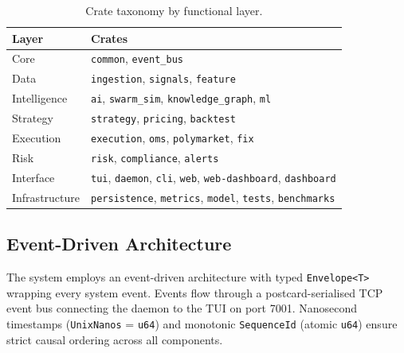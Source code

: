 \documentclass[11pt]{article}
\theoremstyle{definition}
\begin{document}
\begin{table}[H]
\centering
\caption{Crate taxonomy by functional layer.}
\label{tab:crates}
\small
\begin{tabular}{@{}lp{10cm}@{}}
\toprule
\textbf{Layer} & \textbf{Crates} \\
\midrule
Core & \texttt{common}, \texttt{event\_bus} \\
Data & \texttt{ingestion}, \texttt{signals}, \texttt{feature} \\
Intelligence & \texttt{ai}, \texttt{swarm\_sim}, \texttt{knowledge\_graph}, \texttt{ml} \\
Strategy & \texttt{strategy}, \texttt{pricing}, \texttt{backtest} \\
Execution & \texttt{execution}, \texttt{oms}, \texttt{polymarket}, \texttt{fix} \\
Risk & \texttt{risk}, \texttt{compliance}, \texttt{alerts} \\
Interface & \texttt{tui}, \texttt{daemon}, \texttt{cli}, \texttt{web}, \texttt{web-dashboard}, \texttt{dashboard} \\
Infrastructure & \texttt{persistence}, \texttt{metrics}, \texttt{model}, \texttt{tests}, \texttt{benchmarks} \\
\bottomrule
\end{tabular}
\end{table}

\subsection{Event-Driven Architecture}

The system employs an event-driven architecture with typed
\texttt{Envelope<T>} wrapping every system event. Events flow
through a postcard-serialised TCP event bus connecting the daemon
to the TUI on port 7001. Nanosecond timestamps
(\texttt{UnixNanos} = \texttt{u64}) and monotonic
\texttt{SequenceId} (atomic \texttt{u64}) ensure strict causal
ordering across all components.
\end{document}
